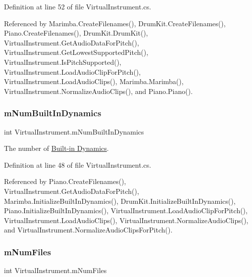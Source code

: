 Definition at line 52 of file Virtual\+Instrument.\+cs.



Referenced by Marimba.\+Create\+Filenames(), Drum\+Kit.\+Create\+Filenames(), Piano.\+Create\+Filenames(), Drum\+Kit.\+Drum\+Kit(), Virtual\+Instrument.\+Get\+Audio\+Data\+For\+Pitch(), Virtual\+Instrument.\+Get\+Lowest\+Supported\+Pitch(), Virtual\+Instrument.\+Is\+Pitch\+Supported(), Virtual\+Instrument.\+Load\+Audio\+Clip\+For\+Pitch(), Virtual\+Instrument.\+Load\+Audio\+Clips(), Marimba.\+Marimba(), Virtual\+Instrument.\+Normalize\+Audio\+Clips(), and Piano.\+Piano().

\mbox{\label{group___v_i_base_pro_var_gac265f64f759d267ee1e1680f8d387011}} 
\subsubsection{\texorpdfstring{m\+Num\+Built\+In\+Dynamics}{mNumBuiltInDynamics}}
{\footnotesize\ttfamily int Virtual\+Instrument.\+m\+Num\+Built\+In\+Dynamics\hspace{0.3cm}{\ttfamily [protected]}}



The number of \hyperlink{group___audio_DefBID}{Built-\/in Dynamics}. 



Definition at line 48 of file Virtual\+Instrument.\+cs.



Referenced by Piano.\+Create\+Filenames(), Virtual\+Instrument.\+Get\+Audio\+Data\+For\+Pitch(), Marimba.\+Initialize\+Built\+In\+Dynamics(), Drum\+Kit.\+Initialize\+Built\+In\+Dynamics(), Piano.\+Initialize\+Built\+In\+Dynamics(), Virtual\+Instrument.\+Load\+Audio\+Clip\+For\+Pitch(), Virtual\+Instrument.\+Load\+Audio\+Clips(), Virtual\+Instrument.\+Normalize\+Audio\+Clips(), and Virtual\+Instrument.\+Normalize\+Audio\+Clips\+For\+Pitch().

\mbox{\label{group___v_i_base_pro_var_ga9a602db8c9833ce75d95dd453c27d341}} 
\subsubsection{\texorpdfstring{m\+Num\+Files}{mNumFiles}}
{\footnotesize\ttfamily int Virtual\+Instrument.\+m\+Num\+Files\hspace{0.3cm}{\ttfamily [protected]}}



